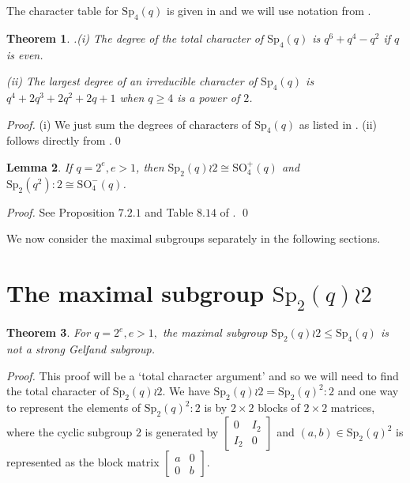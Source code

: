 \documentclass{amsart}
\newtheorem{thm}{Theorem}[section]
\newtheorem{lem}[thm]{Lemma}
\begin{document}
The character table for $\mathrm{Sp}_4(q)$ is given in \cite{speven} and  we will use notation from \cite{speven}. 

\begin{thm}  \cite{speven}.\label{lem:totalsymplectic}  (i) The degree of the total character of $\mathrm{Sp}_4(q)$ is $q^6+q^4-q^2$ if $q$ is even.

(ii) The largest degree of an irreducible character of $\mathrm{Sp}_4(q)$ is $q^4+2q^3+2q^2+2q+1$ when $q\geq 4$ is a power of $2$.
\end{thm}
\noindent\textit{Proof.} (i) We just  sum  the degrees of characters of $\mathrm{Sp}_4(q)$ as listed in \cite{speven}. (ii) follows directly from \cite {speven}.\qed\medskip


\begin{lem}\label{isomorpicmaximal}
If $q=2^e, e>1$, then $\mathrm{Sp}_2(q)\wr 2 \cong \mathrm{SO}_4^+(q)$  and $\mathrm{Sp}_2(q^2)\colon 2 \cong \mathrm{SO}_4^-(q)$.
\end{lem}
\noindent\textit{Proof.} 
See Proposition $7.2.1$  and Table $8.14$ of \cite{max}.  \qed\medskip 


We now consider the maximal subgroups separately in the following sections.

\section { The maximal subgroup $\mathrm{Sp}_2(q)\wr 2 $}


\begin{thm}\label{wreath}
For $q=2^e, e>1,$ the maximal subgroup $\mathrm{Sp}_2(q)\wr 2 \leq \mathrm{Sp}_4(q)$ is not a strong Gelfand subgroup.
\end{thm}
\noindent\textit{Proof.} This proof will be a `total character argument' and so we will need to find the total character of
$\mathrm{Sp}_2(q)\wr 2$. 
We have $\mathrm{Sp}_2(q)\wr 2 = \mathrm{Sp}_2(q)^2: 2$ and one way to  represent the elements of $\mathrm{Sp}_2(q)^2: 2$ is by $2 \times 2$ blocks of $2 \times 2$ matrices, where the cyclic  subgroup $2$ is generated  by  $\begin{bmatrix} 0&I_2\\I_2&0\end{bmatrix}$ and
$(a,b) \in \mathrm{Sp}_2(q)^2$ is represented as the block matrix 
$\begin{bmatrix} a&0\\0&b\end{bmatrix}.$ 
 
\end{document}
